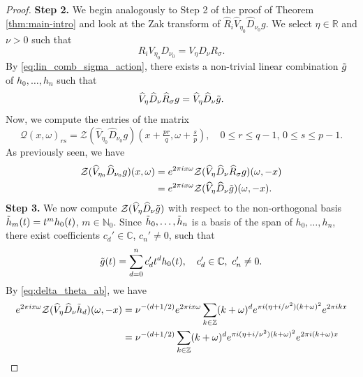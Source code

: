 \documentclass[reqno,a4paper,12pt]{amsart}
\numberwithin{equation}{section}
\newcommand{\N}{\mathbb N}
\newcommand{\Z}{\mathbb Z}
\newcommand{\R}{\mathbb R}
\newcommand{\C}{\mathbb C}
\newcommand{\QQ}{\mathcal{Q}}
\newcommand{\zak}{\mathcal{Z}}
\begin{document}
\begin{proof}
\textbf{Step 2.} We begin analogously to Step 2 of the proof of Theorem \ref{thm:main-intro} and look at the Zak transform of $\widehat{R}_i\widehat{V}_{\eta_0}\widehat{D}_{\nu_0} g$. We select $\eta\in\R$ and $\nu>0$ such that 
\begin{equation}
    R_i V_{\eta_0} D_{\nu_0} = V_\eta D_\nu R_\sigma.
\end{equation}
By \eqref{eq:lin_comb_sigma_action}, there exists a non-trivial linear combination $\Tilde{g}$ of $h_0,\dots,h_n$ such that
\begin{equation}
    \widehat{V}_\eta \widehat{D}_\nu \widehat{R}_\sigma g = \widehat{V}_\eta \widehat{D}_\nu \Tilde{g}.
\end{equation}
Now, we compute the entries of the matrix 
\begin{equation}
         \QQ(x,\omega)_{rs} = \zak (\widehat{V}_{\eta_0} \widehat{D}_{\nu_0}g)( x+\tfrac{pr}{q}, \omega +\tfrac{s}{p}) ,\quad 0\leq r\leq q-1, \, 0\leq s\leq p-1.
     \end{equation}
     As previously seen, we have
     \begin{equation}
         \begin{split}
        \zak (\widehat{V}_{\eta_0} \widehat{D}_{\nu_0}g)( x, \omega)  &=  e^{2\pi i x\omega }\zak (\widehat{V}_{\eta} \widehat{D}_{\nu}\widehat{R}_\sigma g)(\omega , -x) \\
         & =  e^{2\pi i x\omega }\zak (\widehat{V}_{\eta} \widehat{D}_{\nu}\Tilde{g})(\omega, -x).
         \end{split}
     \end{equation}
\textbf{Step 3.} We now compute $\zak (\widehat{V}_{\eta} \widehat{D}_{\nu}\Tilde{g})$ with respect to the non-orthogonal basis $\Tilde{h}_m(t) = t^m h_0(t)$, $m\in\N_0$. Since $\Tilde{h}_0,\dots, \Tilde{h}_n$ is a basis of the span of $h_0,\dots, h_n$, there exist coefficients $c_d'\in\C$, $c_n'\neq 0$, such that 
\begin{equation}
   \Tilde{g}(t) = \sum\limits_{d=0}^n c_d' t^d h_0(t),\quad c_d'\in\C,\ c_n'\neq 0.
\end{equation}
By \eqref{eq:delta_theta_ab}, we have
\begin{equation}
\begin{split}
          e^{2\pi i x\omega }\zak (\widehat{V}_{\eta} \widehat{D}_{\nu}\Tilde{h}_d)(\omega, -x)
     &= \nu^{-(d+1/2)}e^{2\pi i x\omega }\sum\limits_{k\in\Z} (k+\omega)^d e^{\pi i (\eta+i/\nu^2) (k+\omega)^2} e^{2\pi i k x} \\
     &=\nu^{-(d+1/2)} \sum\limits_{k\in\Z} (k+\omega)^d e^{\pi i (\eta+i/\nu^2) (k+\omega)^2} e^{2\pi i (k+\omega) x}\\

\end{split}
\end{equation}
\end{proof}
\end{document}
